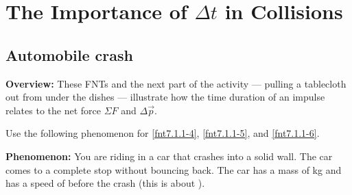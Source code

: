 \section{The Importance of $\Delta t$ in Collisions}



\subsection{Automobile crash}

\begin{overview}
\textbf{Overview:} These FNTs and the next part of the activity --- pulling a tablecloth out from under the dishes --- illustrate how the time duration of an impulse relates to the net force $\Sigma F$ and $\Delta \vec{p}$.
\end{overview}

Use the following phenomenon for \ref{fnt7.1.1-4}, \ref{fnt7.1.1-5}, and \ref{fnt7.1.1-6}.

\textbf{Phenomenon:} You are riding in a car that crashes into a solid wall.  The car comes to a complete stop without bouncing back.  The car has a mass of \unit[1500]{kg} and has a speed of  before the crash (this is about ). 

\begin{fnt}
	
\end{fnt}

\begin{fnt}
	
\end{fnt}

\begin{fnt}
	
\end{fnt}

